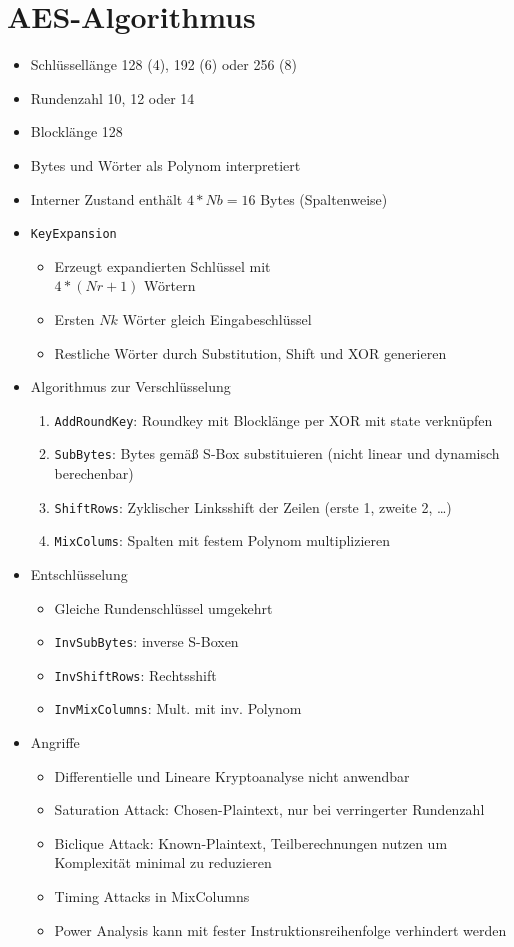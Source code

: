 \documentclass[11pt, paper=a4, twocolumn]{scrartcl}
\begin{document}
	\section{AES-Algorithmus}
		\begin{itemize}
			\item Schlüssellänge 128 (4), 192 (6) oder 256 (8)
			\item Rundenzahl 10, 12 oder 14
			\item Blocklänge 128
			\item Bytes und Wörter als Polynom interpretiert
			\item Interner Zustand enthält $4*Nb=16$ Bytes (Spaltenweise)
			\item \texttt{KeyExpansion}
				\begin{itemize}
					\item Erzeugt expandierten Schlüssel mit\\
						$4*(Nr+1)$ Wörtern
					\item Ersten $Nk$ Wörter gleich Eingabeschlüssel
					\item Restliche Wörter durch Substitution, Shift und XOR generieren 
				\end{itemize}
			\item Algorithmus zur Verschlüsselung
				\begin{enumerate}
					\item \texttt{AddRoundKey}: Roundkey mit Blocklänge per XOR mit state verknüpfen
					\item \texttt{SubBytes}: Bytes gemäß S-Box substituieren (nicht linear und dynamisch berechenbar)
					\item \texttt{ShiftRows}: Zyklischer Linksshift der Zeilen (erste 1, zweite 2, \dots)
					\item \texttt{MixColums}: Spalten mit festem Polynom multiplizieren
				\end{enumerate}
			\item Entschlüsselung
				\begin{itemize}
					\item Gleiche Rundenschlüssel umgekehrt
					\item \texttt{InvSubBytes}: inverse S-Boxen
					\item \texttt{InvShiftRows}: Rechtsshift
					\item \texttt{InvMixColumns}: Mult. mit inv. Polynom
				\end{itemize}
			\item Angriffe
				\begin{itemize}
					\item Differentielle und Lineare Kryptoanalyse nicht anwendbar
					\item Saturation Attack: Chosen-Plaintext, nur bei verringerter Rundenzahl
					\item Biclique Attack: Known-Plaintext, Teilberechnungen nutzen um Komplexität minimal zu reduzieren
					\item Timing Attacks in MixColumns
					\item Power Analysis kann mit fester Instruktionsreihenfolge verhindert werden
				\end{itemize}
		\end{itemize}
	
\end{document}
